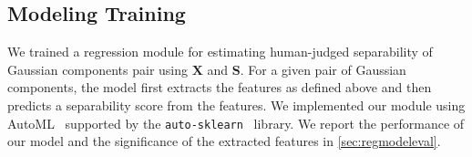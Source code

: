 \subsection{Modeling Training} 

We trained a regression module for estimating human-judged separability of Gaussian components pair using $\mathbf{X}$ and $\mathbf{S}$. 
For a given pair of Gaussian components, the model first extracts the features as defined above and then predicts a separability score from the features. 
We implemented our module using AutoML~\cite{he21kbs} supported by the \verb|auto-sklearn|~\cite{feurer15nips} library. 
We report the performance of our model and the significance of the extracted features in \autoref{sec:regmodeleval}.


 









